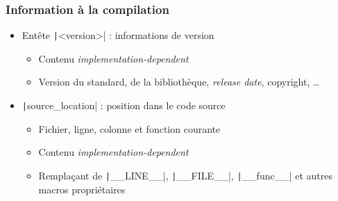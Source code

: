 \documentclass[C++.tex]{subfiles}
\begin{document}
\begin{frame}[fragile]
	\frametitle{Information à la compilation}
	\begin{itemize}
		\item Entête \texttt|<version>| : informations de version
		\begin{itemize}
			\item Contenu \textit{implementation-dependent}
			\item Version du standard, de la bibliothèque, \textit{release date}, copyright, \ldots{}
		\end{itemize}
		\item \texttt|source_location| : position dans le code source
		\begin{itemize}
			\item Fichier, ligne, colonne et fonction courante
			\item Contenu \textit{implementation-dependent}


			\item Remplaçant de \texttt|__LINE__|, \texttt|__FILE__|, \texttt|__func__| et autres macros propriétaires
		\end{itemize}
	\end{itemize}


\end{frame}
\end{document}
